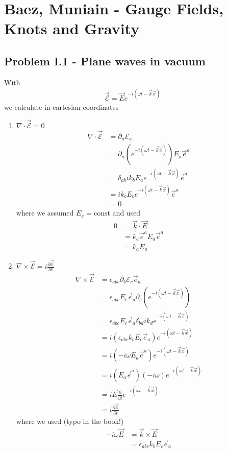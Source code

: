 \documentclass[../main.tex]{subfiles}
\begin{document}
\section{{\sc Baez, Muniain} - Gauge Fields, Knots and Gravity}
\subsection{Problem I.1 - Plane waves in vacuum}
With
\begin{align}
    \vec{\mathcal{E}}=\vec{E}e^{-i(\omega t -\vec{k}\vec{x})}
\end{align}
we calculate in cartesian coordinates 
\begin{enumerate}
    \item $\nabla\cdot\vec{\mathcal{E}}=0$
\begin{align}
    \nabla\cdot\vec{\mathcal{E}}&=\partial_a\mathcal{E}_a\\
    &=\partial_a(e^{-i(\omega t -\vec{k}\vec{x})})E_a\vec{e}^a\\
    &=\delta_{ab}ik_bE_a e^{-i(\omega t -\vec{k}\vec{x})}\vec{e}^a\\
    &=ik_bE_b e^{-i(\omega t -\vec{k}\vec{x})}\vec{e}^a\\
    &=0
\end{align}
where we assumed $E_a=\text{const}$ and used
\begin{align}
    0&=\vec{k}\cdot\vec{E}\\
    &=k_a\vec{e}^aE_a\vec{e}^a\\
    &=k_aE_a
\end{align}

\item $\nabla\times\vec{\mathcal{E}}=i\frac{\partial\vec{\mathcal{E}}}{\partial t}$
\begin{align}
    \nabla\times\vec{\mathcal{E}}&=\epsilon_{abc}\partial_b\mathcal{E}_c\vec{e}_a \\
    &=\epsilon_{abc}E_c\vec{e}_a\partial_b(e^{-i(\omega t -\vec{k}\vec{x})}) \\
    &=\epsilon_{abc}E_c\vec{e}_a\delta_{bd}ik_de^{-i(\omega t -\vec{k}\vec{x})} \\
    &=i(\epsilon_{abc}k_bE_c\vec{e}_a)e^{-i(\omega t -\vec{k}\vec{x})} \\
    &=i(-i\omega E_a\vec{e}^a)e^{-i(\omega t -\vec{k}\vec{x})} \\
    &=i(E_a\vec{e}^a)(-i\omega) e^{-i(\omega t -\vec{k}\vec{x})} \\
    &=i\vec{E}\frac{\partial}{\partial t} e^{-i(\omega t -\vec{k}\vec{x})} \\
    &=i\frac{\partial\vec{\mathcal{E}}}{\partial t}
\end{align}
where we used (typo in the book!)
\begin{align}
    -i\omega\vec{E}&=\vec{k}\times\vec{E}\\
    &=\epsilon_{abc}k_bE_c\vec{e}_a
\end{align}
\end{enumerate}
\end{document}
